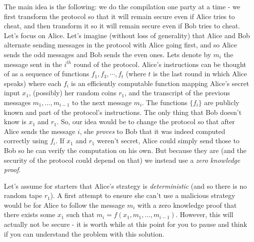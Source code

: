 The main idea is the following: we do the compilation one party at a
time - we first transform the protocol so that it will remain secure
even if Alice tries to cheat, and then transform it so it will remain
secure even if Bob tries to cheat. Let's focus on Alice. Let's imagine
(without loss of generality) that Alice and Bob alternate sending
messages in the protocol with Alice going first, and so Alice sends the
odd messages and Bob sends the even ones. Lets denote by \(m_i\) the
message sent in the \(i^{th}\) round of the protocol. Alice's
instructions can be thought of as a sequence of functions
\(f_1,f_3,\cdots,f_t\) (where \(t\) is the last round in which Alice
speaks) where each \(f_i\) is an efficiently computable function mapping
Alice's secret input \(x_1\), (possibly) her random coins \(r_1\), and
the transcript of the previous messages \(m_1,\ldots,m_{i-1}\) to the
next message \(m_i\). The functions \(\{ f_i \}\) are publicly known and
part of the protocol's instructions. The only thing that Bob doesn't
know is \(x_1\) and \(r_1\). So, our idea would be to change the
protocol so that after Alice sends the message \(i\), she \emph{proves}
to Bob that it was indeed computed correctly using \(f_i\). If \(x_1\)
and \(r_1\) weren't secret, Alice could simply send those to Bob so he
can verify the computation on his own. But because they are (and the
security of the protocol could depend on that) we instead use a
\emph{zero knowledge proof}.

Let's assume for starters that Alice's strategy is \emph{deterministic}
(and so there is no random tape \(r_1\)). A first attempt to ensure she
can't use a malicious strategy would be for Alice to follow the message
\(m_i\) with a zero knowledge proof that there exists some \(x_1\) such
that \(m_i=f(x_1,m_1,\ldots,m_{i-1})\). However, this will actually not
be secure - it is worth while at this point for you to pause and think
if you can understand the problem with this solution.


\newpage



